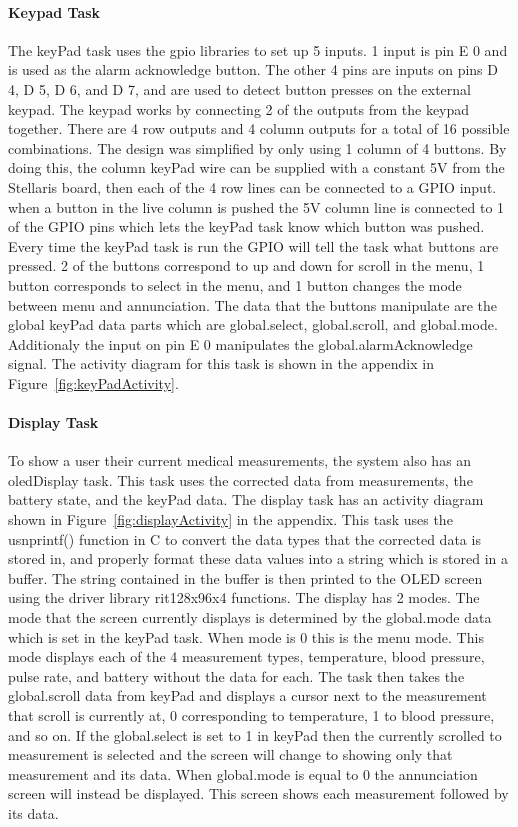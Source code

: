 \documentclass[12pt]{article} %
\begin{document}
    
	\paragraph{Keypad Task}
    The keyPad task uses the gpio libraries to set up 5 inputs. 1 input is pin E 0 and is used as the alarm acknowledge button. The other 4 pins are inputs on pins D 4, D 5, D 6, and D 7, and are used to detect button presses on the external keypad. The keypad works by connecting 2 of the outputs from the keypad together. There are 4 row outputs and 4 column outputs for a total of 16 possible combinations. The design was simplified by only using 1 column of 4 buttons. By doing this, the column keyPad wire can be supplied with a constant 5V from the Stellaris board, then each of the 4 row lines can be connected to a GPIO input. when a button in the live column is pushed the 5V column line is connected to 1 of the GPIO pins which lets the keyPad task know which button was pushed. Every time the keyPad task is run the GPIO will tell the task what buttons are pressed. 2 of the buttons correspond to up and down for scroll in the menu, 1 button corresponds to select in the menu, and 1 button changes the mode between menu and annunciation. The data that the buttons manipulate are the global keyPad data parts which are global.select, global.scroll, and global.mode. Additionaly the input on pin E 0 manipulates the global.alarmAcknowledge signal. The activity diagram for this task is shown in the appendix in Figure~\ref{fig:keyPadActivity}.
    \paragraph{Display Task}
    To show a user their current medical measurements, the system also has an
    oledDisplay task. This task uses the corrected data from measurements, the
    battery state, and the keyPad data. The display task has an activity diagram shown in
    Figure~\ref{fig:displayActivity} in the appendix. This task uses the usnprintf()
    function in C to convert the data types that the corrected data is stored in,
    and properly format these data values into a string which is stored in a
    buffer. The string contained in the buffer is then printed to the OLED screen
    using the driver library rit128x96x4 functions. The display has 2 modes. The mode that the screen currently displays is determined by the global.mode data which is set in the keyPad task. When mode is 0 this is the menu mode. This mode displays each of the 4 measurement types, temperature, blood pressure, pulse rate, and battery without the data for each. The task then takes the global.scroll data from keyPad and displays a cursor next to the measurement that scroll is currently at, 0 corresponding to temperature, 1 to blood pressure, and so on. If the global.select is set to 1 in keyPad then the currently scrolled to measurement is selected and the screen will change to showing only that measurement and its data. When global.mode is equal to 0 the annunciation screen will instead be displayed. This screen shows each measurement followed by its data.
    
\end{document}
